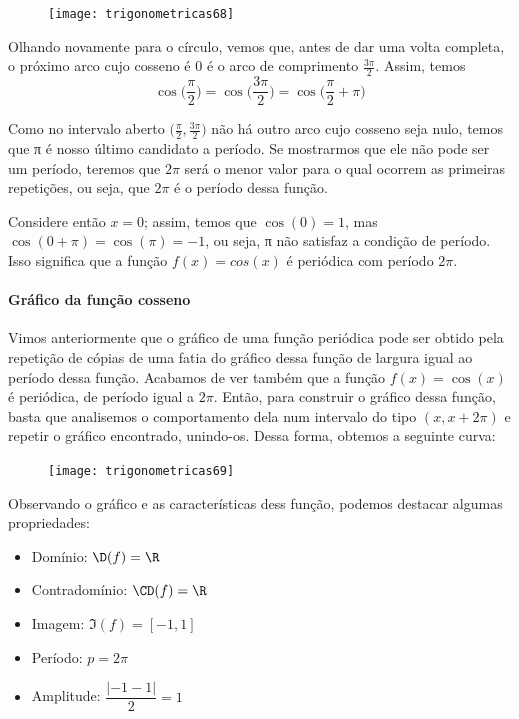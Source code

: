 \begin{figure}[H]
\centering

\texttt{[image: trigonometricas68]}
\end{figure}

Olhando novamente para o círculo, vemos que, antes de dar uma volta completa, o próximo arco cujo cosseno é $0$ é o arco de comprimento $\frac{3\pi}{2}$. Assim, temos
\begin{equation*}
\cos\bigg(\frac{\pi}{2}\bigg)=\cos\bigg(\frac{3\pi}{2}\bigg)=\cos\bigg(\frac{\pi}{2}+\pi\bigg)  
\end{equation*}

Como no intervalo aberto $\big(\frac{\pi}{2},\frac{3\pi}{2}\big)$ não há outro arco cujo cosseno seja nulo, temos que π é nosso último candidato a período. Se mostrarmos que ele não pode ser um período, teremos que $2\pi$ será o menor valor para o qual ocorrem as primeiras repetições, ou seja, que $2\pi$ é o período dessa função.

Considere então $x=0$; assim, temos que $\cos(0)=1$, mas $\cos(0+\pi)=\cos(\pi)=-1$, ou seja, π não satisfaz a condição de período. Isso significa que a função $f(x)=cos(x)$ é periódica com período $2\pi$.

\ifnum{}
\clearpage
\else
\fi
\paragraph{Gráfico da função cosseno}

Vimos anteriormente que o gráfico de uma função periódica pode ser obtido pela repetição de cópias de uma fatia do gráfico dessa função de largura igual ao período dessa função. Acabamos de ver também que a função $f(x)=\cos(x)$ é periódica, de período igual a $2\pi$. Então, para construir o gráfico dessa função, basta que analisemos o comportamento dela num intervalo do tipo $(x,x+2\pi)$ e repetir o gráfico encontrado, unindo-os. Dessa forma, obtemos a seguinte curva:

\begin{figure}[H]
\centering

\texttt{[image: trigonometricas69]}
\end{figure}

Observando o gráfico e as características dess função, podemos destacar algumas propriedades:
\begin{itemize}
\item Domínio: $\D(f)=\R$
\item Contradomínio: $\CD(f)=\R$
\item Imagem: $\Im(f)=[-1,1]$
\item Período: $p=2\pi$
\item Amplitude: $\dfrac{|-1-1|}{2}=1$
\end{itemize}

